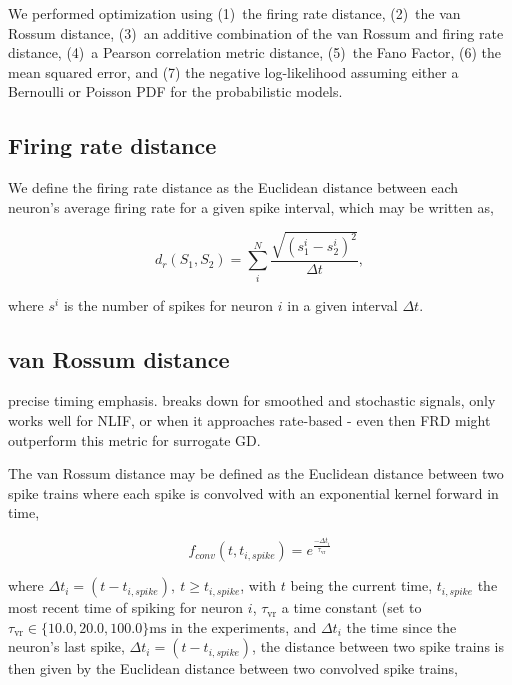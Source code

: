 \documentclass[mphil,deptreport,ai]{infthesis} %
\begin{document}

We performed optimization using (1)~the firing rate distance, (2)~the van Rossum distance, (3)~an additive combination of the van Rossum and firing rate distance, (4)~a Pearson correlation metric distance, (5)~the Fano Factor, (6) the mean squared error, and (7) the negative log-likelihood assuming either a Bernoulli or Poisson PDF for the probabilistic models.

\subsection{Firing rate distance}

We define the firing rate distance as the Euclidean distance between each neuron's average firing rate for a given spike interval, which may be written as,

\begin{equation}
    d_r(S_1, S_2) = \sum_i^N{\frac{\sqrt{(s_1^i - s_2^i)^2}}{\Delta t}},
\end{equation}

where $s^i$ is the number of spikes for neuron $i$ in a given interval $\Delta t$.

\subsection{van Rossum distance}

precise timing emphasis. breaks down for smoothed and stochastic signals, only works well for NLIF, or when it approaches rate-based - even then FRD might outperform this metric for surrogate GD.

The van Rossum distance \cite{VanRossum2001} may be defined as the Euclidean distance between two spike trains where each spike is convolved with an exponential kernel forward in time,

\begin{equation}
    f_{conv}(t, t_{i, spike}) = e^{\frac{-\Delta t_i}{\tau_{\mathrm{vr}}}}
\end{equation}

where $\Delta t_i = (t-t_{i, spike}),\ t \geq t_{i,spike}$, 
with $t$ being the current time, $t_{i,spike}$ the most recent time of spiking for neuron $i$, $\tau_{\mathrm{vr}}$ a time constant (set to $\tau_{\mathrm{vr}} \in \{10.0, 20.0, 100.0\} \si{\ms}$ in the experiments, and $\Delta t_i$ the time since the neuron's last spike, $\Delta t_i = (t-t_{i, spike})$, the distance between two spike trains is then given by the Euclidean distance between two convolved spike trains,
\end{document}
